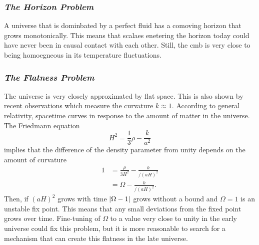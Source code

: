 \documentclass[12pt]{article}
\begin{document}
\subsubsection{\textit{The Horizon Problem}}

A universe that is dominbated by a perfect fluid has a comoving horizon that grows monotonically. This means that scalaes enetering the horizon today could have never been in causal contact with each other. Still, the cmb is very close to being homoegneous in its temperature fluctuations. 

\subsubsection{\textit{The Flatness Problem}}
The universe is very closely approximated by flat space. This is also shown by recent observations which measure the curvature $k \approx 1$. According to general relativity, spacetime curves in response to the amount of matter in the universe. The Friedmann equation
\begin{equation}
    H^2 = \frac{1}{3}\rho - \frac{k}{a^2}
\end{equation}
implies that the difference of the density parameter from unity depends on the amount of curvature
\begin{align}
    1 &= \frac{\rho}{3H^2} - \frac{k}{/(aH)^2}\\
    &= \Omega - \frac{k}{/(aH)^2}.
\end{align}
Then, if $(aH)^2$ grows with time $\abs{\Omega - 1}$ grows without a bound and $\Omega = 1$ is an unstable fix point. This means that any small deviations from the fixed point grows over time. Fine-tuning of $\Omega$ to a value very close to unity in the early universe could fix this problem, but it is more reasonable to search for a mechanism that can create this flatness in the late universe. 
\end{document}
